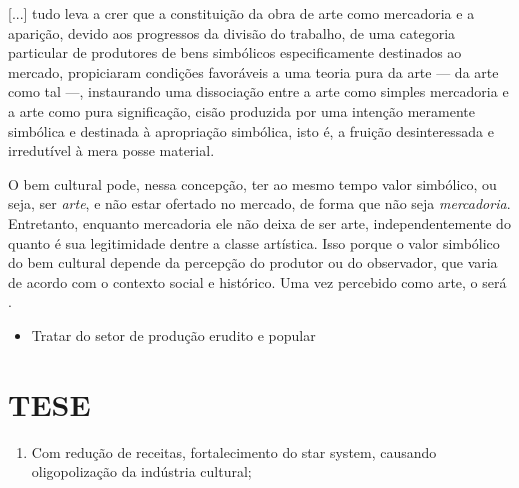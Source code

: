\documentclass[
]{article}
\providecommand{\tightlist}{%
  \setlength{\itemsep}{0pt}\setlength{\parskip}{0pt}}
\newenvironment{citacao}
    {\begin{quoting}[rightmargin=0cm,leftmargin=4cm]
    \begin{singlespace}
    \footnotesize
    }
    {\end{singlespace}
    \end{quoting}
    }
\begin{document}
\begin{citacao}
[...] tudo leva a crer que a constituição da obra de arte como mercadoria e a aparição, devido aos progressos da divisão do trabalho, de uma categoria particular de produtores de bens simbólicos especificamente destinados ao mercado, propiciaram condições favoráveis a uma teoria pura da arte --- da arte como tal ---, instaurando uma dissociação entre a arte como simples mercadoria e a arte como pura significação, cisão produzida por uma intenção meramente simbólica e destinada à apropriação simbólica, isto é, a fruição desinteressada e irredutível à mera posse material. \citep[p.~103]{bourdieu}
\end{citacao}

O bem cultural pode, nessa concepção, ter ao mesmo tempo valor
simbólico, ou seja, ser \emph{arte}, e não estar ofertado no mercado, de
forma que não seja \emph{mercadoria}. Entretanto, enquanto mercadoria
ele não deixa de ser arte, independentemente do quanto é sua
legitimidade dentre a classe artística. Isso porque o valor simbólico do
bem cultural depende da percepção do produtor ou do observador, que
varia de acordo com o contexto social e histórico. Uma vez percebido
como arte, o será \citep[p.~272]{bourdieu}.

\begin{itemize}
\tightlist
\item
  Tratar do setor de produção erudito e popular
\end{itemize}

\hypertarget{tese}{%
\section{TESE}\label{tese}}

\begin{enumerate}
\def\labelenumi{\arabic{enumi}.}
\tightlist
\item
  Com redução de receitas, fortalecimento do star system, causando
  oligopolização da indústria cultural;
\end{enumerate}

\renewcommand\refname{REFERÊNCIAS}
  
\end{document}
